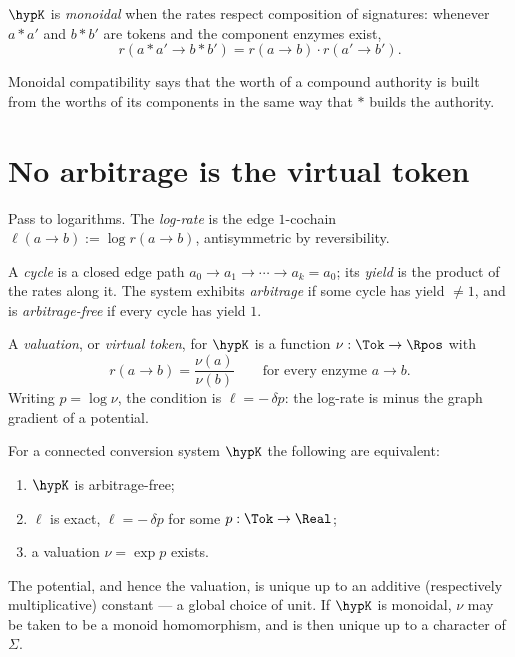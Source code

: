 \begin{definition}
\label{def:monoidal-conv}
$\hypK$ is \emph{monoidal} when the rates respect composition of
signatures: whenever $a \ast a'$ and $b \ast b'$ are tokens and the
component enzymes exist,
\[
  r(a \ast a' \to b \ast b') = r(a \to b) \cdot r(a' \to b') .
\]
\end{definition}

Monoidal compatibility says that the worth of a compound authority is
built from the worths of its components in the same way that $\ast$
builds the authority.

\section{No arbitrage is the virtual token}

Pass to logarithms.
The \emph{log-rate} is the edge $1$-cochain
$\ell(a \to b) := \log r(a \to b)$, antisymmetric by reversibility.

\begin{definition}[Arbitrage]
\label{def:arbitrage}
A \emph{cycle} is a closed edge path
$a_0 \to a_1 \to \cdots \to a_k = a_0$; its \emph{yield} is the product
of the rates along it.
The system exhibits \emph{arbitrage} if some cycle has yield $\neq 1$,
and is \emph{arbitrage-free} if every cycle has yield $1$.
\end{definition}

\begin{definition}
\label{def:virtual-token}
A \emph{valuation}, or \emph{virtual token}, for $\hypK$ is a function
$\nu : \Tok \to \Rpos$ with
\[
  r(a \to b) = \frac{\nu(a)}{\nu(b)} \qquad \text{for every enzyme } a \to b .
\]
Writing $p = \log \nu$, the condition is $\ell = -\,\delta p$: the
log-rate is minus the graph gradient of a potential.
\end{definition}

\begin{theorem}
\label{thm:vtok-ftap}
For a connected conversion system $\hypK$ the following are equivalent:
\begin{enumerate}[label=\textup{(\roman*)}]
  \item $\hypK$ is arbitrage-free;
  \item $\ell$ is exact, $\ell = -\,\delta p$ for some $p : \Tok \to \Real$;
  \item a valuation $\nu = \exp p$ exists.
\end{enumerate}
The potential, and hence the valuation, is unique up to an additive
(respectively multiplicative) constant --- a global choice of unit.
If $\hypK$ is monoidal, $\nu$ may be taken to be a monoid homomorphism,
and is then unique up to a character of $\Sigma$.
\end{theorem}

